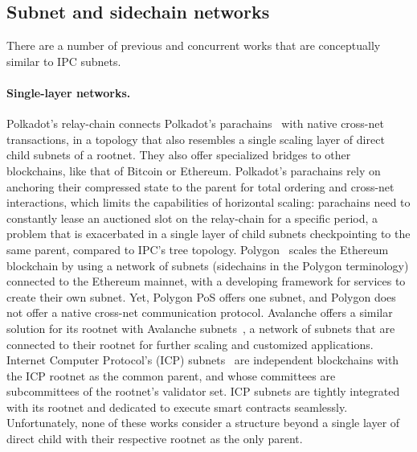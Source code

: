     \subsection{Subnet and sidechain networks}
    There are a number of previous and concurrent works that are conceptually similar to IPC subnets. 
    
    \paragraph{Single-layer networks.} Polkadot's relay-chain connects Polkadot's parachains~\cite{polkadotparachains} with native cross-net transactions, in a topology that also resembles a single scaling layer of direct child subnets of a rootnet. They also offer specialized bridges to other blockchains, like that of Bitcoin or Ethereum. Polkadot's parachains rely on anchoring their compressed state to the parent for total ordering and cross-net interactions, which limits the capabilities of horizontal scaling: parachains need to constantly lease an auctioned slot on the relay-chain for a specific period, a problem that is exacerbated in a single layer of child subnets checkpointing to the same parent, compared to IPC's tree topology. Polygon~\cite{polygonpos, polygonsupernets} scales the Ethereum blockchain by using a network of subnets (sidechains in the Polygon terminology) connected to the Ethereum mainnet, with a developing framework for services to create their own subnet. Yet, Polygon PoS offers one subnet, and Polygon does not offer a native cross-net communication protocol. Avalanche offers a similar solution for its rootnet with Avalanche subnets~\cite{avaxsubnets}, a network of subnets that are connected to their rootnet for further scaling and customized applications. 
    Internet Computer Protocol's (ICP) subnets~\cite{icp} are independent blockchains with the ICP rootnet as the common parent, and whose committees are subcommittees of the rootnet's validator set. ICP subnets are tightly integrated with its rootnet and dedicated to execute smart contracts seamlessly. Unfortunately, none of these works consider a structure beyond a single layer of direct child with their respective rootnet as the only parent. 

